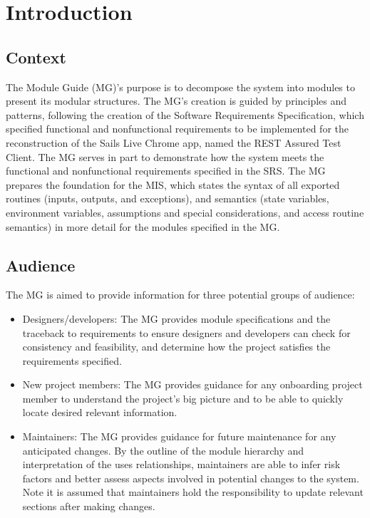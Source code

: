 \documentclass[12pt, titlepage]{article}
\begin{document}
\section{Introduction}

\subsection{Context}

The Module Guide (MG)’s purpose is to decompose the system into modules to present its modular structures. The MG’s creation is guided by principles and patterns, following the creation of the Software Requirements Specification, which specified functional and nonfunctional requirements to be implemented for the reconstruction of the Sails Live Chrome app, named the REST Assured Test Client. The MG serves in part to demonstrate how the system meets the functional and nonfunctional requirements specified in the SRS. The MG prepares the foundation for the MIS, which states the syntax of all exported routines (inputs, outputs, and exceptions), and semantics (state variables, environment variables, assumptions and special considerations, and access routine semantics) in more detail for the modules specified in the MG.  

\subsection{Audience} 

The MG is aimed to provide information for three potential groups of audience:

\begin{itemize}
\item Designers/developers: The MG provides module specifications and the traceback to requirements to ensure designers and developers can check for consistency and feasibility, and determine how the project satisfies the requirements specified. 

\item New project members: The MG provides guidance for any onboarding project member to understand the project’s big picture and to be able to quickly locate desired relevant information. 

\item Maintainers: The MG provides guidance for future maintenance for any anticipated changes. By the outline of the module hierarchy and interpretation of the uses relationships, maintainers are able to infer risk factors and better assess aspects involved in potential changes to the system. Note it is assumed that maintainers hold the responsibility to update relevant sections after making changes.
\end{itemize}
\end{document}
